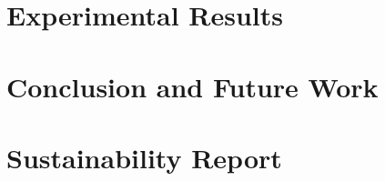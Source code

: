\documentclass{article}
\begin{document}
\section{Experimental Results}
  
\section{Conclusion and Future Work}
  
\section{Sustainability Report}
  





























%
\end{document}
